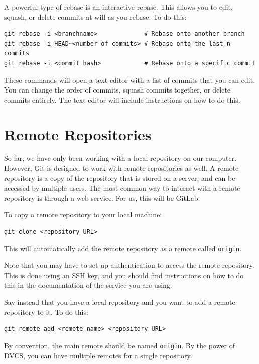 \documentclass[fleqn]{article}
\begin{document}
A powerful type of rebase is an interactive rebase. This allows you to edit,
squash, or delete commits at will as you rebase. To do this:

\begin{lstlisting}
git rebase -i <branchname>             # Rebase onto another branch
git rebase -i HEAD~<number of commits> # Rebase onto the last n commits
git rebase -i <commit hash>            # Rebase onto a specific commit
\end{lstlisting}

These commands will open a text editor with a list of commits that you can
edit. You can change the order of commits, squash commits together, or delete
commits entirely. The text editor will include instructions on how to do this.

\pagebreak

\section*{Remote Repositories}

So far, we have only been working with a local repository on our computer.
However, Git is designed to work with remote repositories as well. A remote
repository is a copy of the repository that is stored on a server, and can be
accessed by multiple users. The most common way to interact with a remote
repository is through a web service. For us, this will be GitLab.

To copy a remote repository to your local machine:

\begin{lstlisting}
git clone <repository URL>
\end{lstlisting}

This will automatically add the remote repository as a remote called
\texttt{origin}.

Note that you may have to set up authentication to access the remote repository.
This is done using an SSH key, and you should find instructions on how to do
this in the documentation of the service you are using.

Say instead that you have a local repository and you want to add a remote
repository to it. To do this:

\begin{lstlisting}
git remote add <remote name> <repository URL>
\end{lstlisting}

By convention, the main remote should be named \texttt{origin}. By the power of
DVCS, you can have multiple remotes for a single repository.
\end{document}
